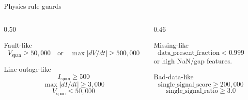 ﻿\documentclass[10pt,aspectratio=169]{beamer}
\begin{document}
\begin{frame}{Physics rule guards}
\small
\begin{columns}[T,totalwidth=\textwidth]
\begin{column}{0.50\textwidth}
\begin{block}{Fault-like}
\[
V_{\mathrm{span}} \ge 50{,}000
\quad\mathrm{or}\quad
\max |dV/dt| \ge 500{,}000
\]
\end{block}
\begin{block}{Line-outage-like}
\[
I_{\mathrm{span}} \ge 500
\]
\[
\max |dI/dt| \ge 3{,}000
\]
\[
V_{\mathrm{span}} \le 50{,}000
\]
\end{block}
\end{column}
\begin{column}{0.46\textwidth}
\begin{alertblock}{Missing-like}
\[
\mathrm{data\_present\_fraction}<0.999
\]
or high NaN/gap features.
\end{alertblock}
\begin{alertblock}{Bad-data-like}
\[
\mathrm{single\_signal\_score}\ge 200{,}000
\]
\[
\mathrm{single\_signal\_ratio}\ge 3.0
\]
\end{alertblock}
\end{column}
\end{columns}
\end{frame}
\end{document}
